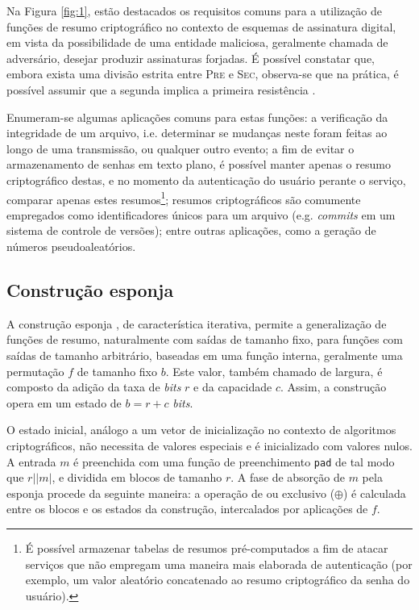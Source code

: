 \documentclass[12pt]{report}
\newcommand{\length}[1]{\vert #1 \vert}
\begin{document}
Na Figura \ref{fig:1}, estão destacados os requisitos comuns para a utilização
de funções de resumo criptográfico no contexto de esquemas de assinatura
digital, em vista da possibilidade de uma entidade maliciosa, geralmente
chamada de adversário, desejar produzir assinaturas forjadas. É possível
constatar que, embora exista uma divisão estrita entre \textsc{Pre} e
\textsc{Sec}, observa-se que na prática, é possível assumir que a segunda
implica a primeira resistência \cite{Menezes:1996:HAC:548089}.

Enumeram-se algumas aplicações comuns para estas funções: a verificação da
integridade de um arquivo, i.e. determinar se mudanças neste foram feitas ao
longo de uma transmissão, ou qualquer outro evento; a fim de evitar o
armazenamento de senhas em texto plano, é possível manter apenas o resumo
criptográfico destas, e no momento da autenticação do usuário perante o
serviço, comparar apenas estes resumos\footnote{É possível armazenar tabelas de
resumos pré-computados a fim de atacar serviços que não empregam uma maneira
mais elaborada de autenticação (por exemplo, um valor aleatório
concatenado ao resumo criptográfico da senha do usuário).}; resumos
criptográficos são comumente empregados como identificadores únicos para um
arquivo (e.g. \emph{commits} em um sistema de controle de versões); entre
outras aplicações, como a geração de números pseudoaleatórios.

\subsection{Construção esponja}

A construção esponja \cite{SpongeReference}, de característica iterativa,
permite a generalização de funções de resumo, naturalmente com saídas de
tamanho fixo, para funções com saídas de tamanho arbitrário, baseadas em uma
função interna, geralmente uma permutação $f$ de tamanho fixo $b$. Este valor,
também chamado de largura, é composto da adição da taxa de \emph{bits} $r$ e da
capacidade $c$. Assim, a construção opera em um estado de $b = r + c$
\emph{bits}.

O estado inicial, análogo a um vetor de inicialização no contexto de algoritmos
criptográficos, não necessita de valores especiais e é inicializado com valores
nulos. A entrada $m$ é preenchida com uma função de preenchimento \texttt{pad}
de tal modo que $r \mid \length{m}$, e dividida em blocos de tamanho $r$. A
fase de absorção de $m$ pela esponja procede da seguinte maneira: a operação de
ou exclusivo ($\oplus$) é calculada entre os blocos e os estados da construção,
intercalados por aplicações de $f$.
\end{document}

